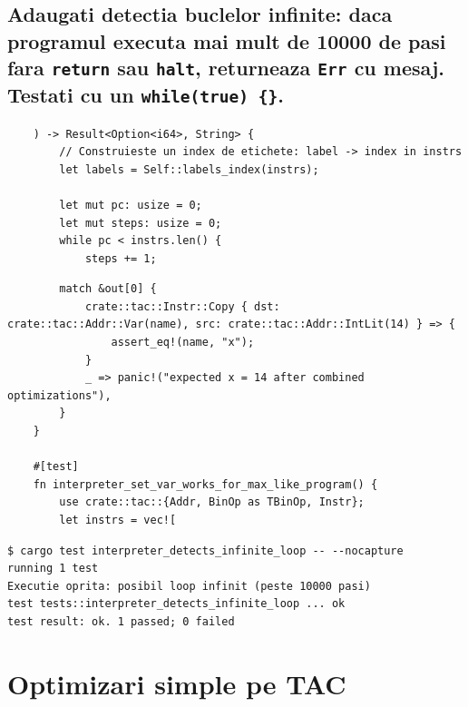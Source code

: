 \documentclass[11pt]{article}
\begin{document}
\subsection{Adaugati detectia buclelor infinite: daca programul executa mai mult de 10000 de pasi fara \texttt{return} sau \texttt{halt}, returneaza \texttt{Err} cu mesaj. Testati cu un \texttt{while(true) \{\}}.}
\label{sec:org51a3dfb}
\begin{verbatim}
    ) -> Result<Option<i64>, String> {
        // Construieste un index de etichete: label -> index in instrs
        let labels = Self::labels_index(instrs);

        let mut pc: usize = 0;
        let mut steps: usize = 0;
        while pc < instrs.len() {
            steps += 1;
\end{verbatim}
\begin{verbatim}
        match &out[0] {
            crate::tac::Instr::Copy { dst: crate::tac::Addr::Var(name), src: crate::tac::Addr::IntLit(14) } => {
                assert_eq!(name, "x");
            }
            _ => panic!("expected x = 14 after combined optimizations"),
        }
    }

    #[test]
    fn interpreter_set_var_works_for_max_like_program() {
        use crate::tac::{Addr, BinOp as TBinOp, Instr};
        let instrs = vec![
\end{verbatim}
\begin{verbatim}
$ cargo test interpreter_detects_infinite_loop -- --nocapture
running 1 test
Executie oprita: posibil loop infinit (peste 10000 pasi)
test tests::interpreter_detects_infinite_loop ... ok
test result: ok. 1 passed; 0 failed
\end{verbatim}
\section{Optimizari simple pe TAC}
\label{sec:orge637f9a}
\end{document}
